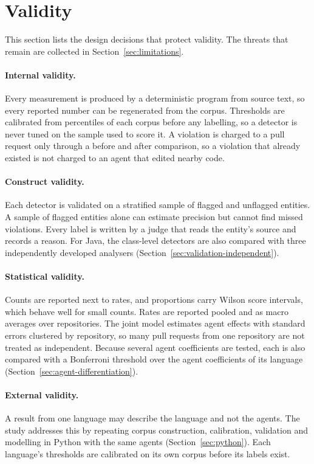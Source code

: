 \section{Validity}
\label{sec:validity}

This section lists the design decisions that protect validity. The threats that remain are
collected in Section~\ref{sec:limitations}.

\paragraph{Internal validity.} Every measurement is produced by a deterministic program from source
text, so every reported number can be regenerated from the corpus. Thresholds are calibrated from
percentiles of each corpus before any labelling, so a detector is never tuned on the sample used to
score it. A violation is charged to a pull request only through a before and after comparison, so a
violation that already existed is not charged to an agent that edited nearby code.

\paragraph{Construct validity.} Each detector is validated on a stratified sample of flagged and
unflagged entities. A sample of flagged entities alone can estimate precision but cannot find missed
violations. Every label is written by a judge that reads the entity's source and records a reason.
For Java, the class-level detectors are also compared with three independently developed analysers
(Section~\ref{sec:validation-independent}).

\paragraph{Statistical validity.} Counts are reported next to rates, and proportions carry Wilson
score intervals, which behave well for small counts. Rates are reported pooled and as macro
averages over repositories. The joint model estimates agent effects with standard errors clustered
by repository, so many pull requests from one repository are not treated as independent. Because
several agent coefficients are tested, each is also compared with a Bonferroni threshold over the
agent coefficients of its language (Section~\ref{sec:agent-differentiation}).

\paragraph{External validity.} A result from one language may describe the language and not the
agents. The study addresses this by repeating corpus construction, calibration, validation and
modelling in Python with the same agents (Section~\ref{sec:python}). Each language's thresholds are
calibrated on its own corpus before its labels exist.

